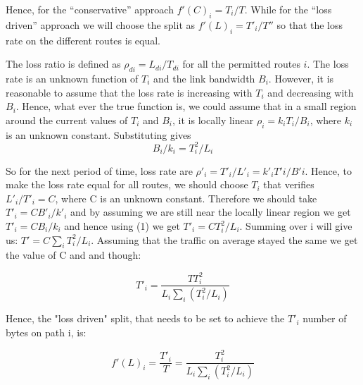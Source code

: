 Hence, for the “conservative” approach $f'(C)_{i} = T_{i}/T$. While for the “loss driven” approach we will choose the split as  $f'(L)_{i} = T'_{i}/T''$ so that the loss rate on the different routes is equal.

The loss ratio is defined as $\rho_{di} = L_{di}/T_{di}$ for all the permitted routes $i.$ The loss rate is an unknown function of $T_{i}$ and the link bandwidth $B_{i}$. However, it is reasonable to assume that the loss rate is increasing with $T_{i}$ and decreasing with $B_{i}$. Hence, what ever the true function is, we could assume that in a small region around the current values of $T_{i}$ and $B_{i}$, it is locally linear $\rho_{i} = k_{i}T_{i}/B_{i}$, where $k_{i}$ is an unknown constant. Substituting gives
\begin{equation}
B_{i}/k_{i} = T_{i}^{2}/L_{i}
\end{equation}

So for the next period of time, loss rate are $\rho'_{i} = T'_{i}/L'_{i} = k'_{i}T'{i}/B'{i}$. Hence, to make the loss rate equal for all routes, we should choose $T_{i}$ that verifies $L'_{i}/T'_{i}=C$, where C is an unknown constant. Therefore we should take  $T'_{i}= CB'_{i}/k'_{i}$ and by assuming we are still near the locally linear region we get  $T'_{i}= CB_{i}/k_{i}$ and hence using (1) we get  $T'_{i}= CT_{i}^{2}/L_{i}$. Summing over i will give us: $T' = C \sum_{i} T_{i}^2/L_{i}$. Assuming that the traffic on average stayed the same we get the value of C and and though: 

\begin{equation}
T'_{i} = \frac {TT_{i}^{2}} {L_{i} \sum_{i} (T_{i}^2/L_{i})}
\end{equation}

Hence, the "loss driven" split, that needs to be set to achieve the $T'_{i}$ number of bytes on path i, is:

\begin{equation}
f'(L)_{i} = \frac{T'_{i}}{T} =  \frac {T_{i}^{2}} {L_{i} \sum_{i} (T_{i}^2/L_{i})}
\end{equation}

